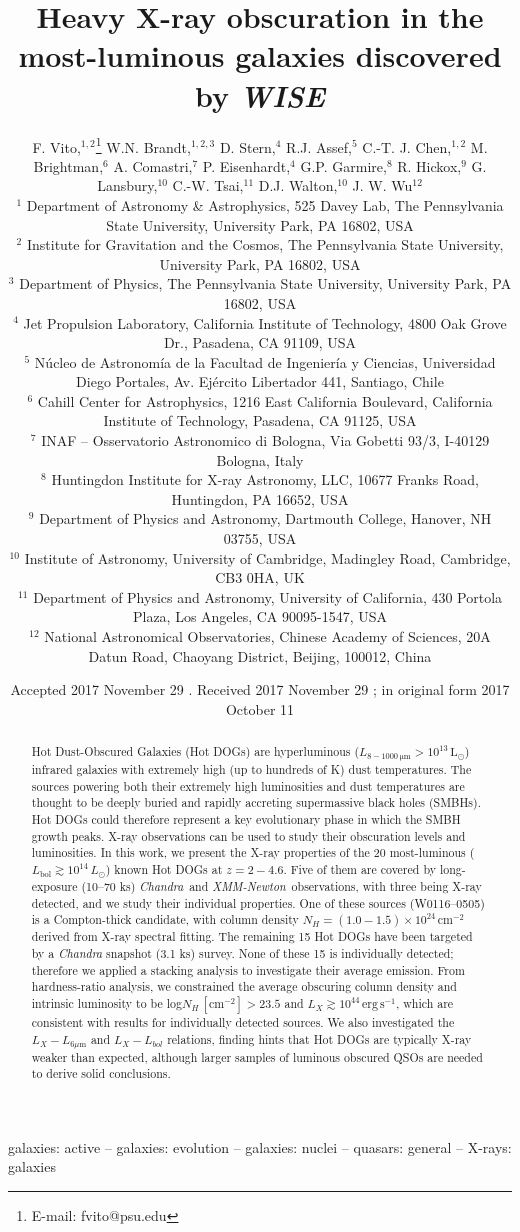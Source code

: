 \documentclass[useAMS,usenatbib]{mnras}
\title[Heavy obscuration in Hot Dust-Obscured Galaxies]{Heavy X-ray obscuration in the most-luminous galaxies discovered by \textit{WISE} }
\author[F. Vito et al.]
{F. Vito,$^{1,2}$\thanks{E-mail: fvito@psu.edu}
W.N. Brandt,$^{1,2,3}$
D. Stern,$^{4}$
R.J. Assef,$^{5}$
C.-T. J. Chen,$^{1,2}$
M. Brightman,$^{6}$
\newauthor
A. Comastri,$^{7}$
P. Eisenhardt,$^{4}$
G.P. Garmire,$^{8}$
R. Hickox,$^{9}$
G. Lansbury,$^{10}$
\newauthor
C.-W. Tsai,$^{11}$
D.J. Walton,$^{10}$
J. W. Wu$^{12}$\\
$^{1}$ Department of Astronomy \& Astrophysics, 525 Davey Lab, The Pennsylvania State University, University Park, PA 16802, USA\\
$^{2}$ Institute for Gravitation and the Cosmos, The Pennsylvania State University, University Park, PA 16802, USA\\
$^{3}$ Department of Physics, The Pennsylvania State University, University Park, PA 16802, USA\\
$^{4}$ Jet Propulsion Laboratory, California Institute of Technology, 4800 Oak Grove Dr., Pasadena, CA 91109, USA\\
$^{5}$ N\'ucleo de Astronom\'ia de la Facultad de Ingenier\'ia y Ciencias, Universidad Diego Portales, Av. Ej\'ercito Libertador 441, Santiago, Chile\\
$^{6}$ Cahill Center for Astrophysics, 1216 East California Boulevard, California Institute of Technology, Pasadena, CA 91125, USA\\
$^{7}$ INAF – Osservatorio Astronomico di Bologna, Via Gobetti 93/3, I-40129 Bologna, Italy\\
$^{8}$ Huntingdon Institute for X-ray Astronomy, LLC, 10677 Franks Road, Huntingdon, PA 16652, USA\\
$^{9}$ Department of Physics and Astronomy, Dartmouth College, Hanover, NH 03755, USA\\
$^{10}$ Institute of Astronomy, University of Cambridge, Madingley Road, Cambridge, CB3 0HA, UK\\
$^{11}$ Department of Physics and Astronomy, University of California, 430 Portola Plaza, Los Angeles, CA 90095-1547, USA\\
$^{12}$ National Astronomical Observatories, Chinese Academy of Sciences, 20A Datun Road, Chaoyang District, Beijing, 100012, China\\
}
\date{Accepted 2017 November 29 . Received 2017 November 29 ; in original form 2017 October 11}
\newcommand*{\lunit}{\ensuremath{\mathrm{erg\,s^{-1}}}}
\newcommand*{\xmm}{\textit{\mbox{XMM-Newton}}}
\newcommand*{\chandra}{\textit{Chandra}}
\newcommand*{\nhunits}{\mathrm{cm^{-2}}}
\begin{document}
\graphicspath{{.}}
\pagerange{\pageref{firstpage}--\pageref{lastpage}} 
\maketitle
\label{firstpage}

\begin{abstract}
Hot Dust-Obscured Galaxies (Hot DOGs) are hyperluminous  (\mbox{$L_{\mathrm{8-1000\,\mu m}}>10^{13}\,\mathrm{L_\odot}$}) infrared galaxies with extremely high (up to hundreds of K) dust temperatures. The sources powering both their extremely high luminosities and dust temperatures are thought to be deeply buried and rapidly accreting supermassive black holes (SMBHs). Hot DOGs could therefore represent a key evolutionary phase in which the SMBH growth peaks. X-ray observations can be used to study their obscuration levels and luminosities. In this work, we present the X-ray properties of the 20 most-luminous ($L_{\mathrm{bol}}\gtrsim10^{14}\, L_\odot$) known Hot DOGs  at $z=2-4.6$. Five of them are covered by long-exposure (10--70 ks) \chandra\, and \xmm\, observations, with three being X-ray detected, and we study their individual properties.
One of these sources (W0116--0505) is a Compton-thick candidate, with column density $N_H=(1.0-1.5)\times10^{24}\,\nhunits$ derived from X-ray spectral fitting. The remaining 15 Hot DOGs have been targeted by a \textit{Chandra} snapshot (3.1 ks) survey. None of these 15 is individually detected; therefore we applied a stacking analysis to investigate their average emission. From hardness-ratio analysis, we constrained the average obscuring column density and intrinsic luminosity to be log$N_H\,\mathrm{[\nhunits]}>23.5$ and $L_X\gtrsim10^{44}\,\lunit$, which are consistent with results for individually detected sources. We also investigated the $L_X-L_{6\mu\mathrm{m}}$ and $L_X-L_{bol}$ relations, finding hints that Hot DOGs are typically X-ray weaker than expected, although larger samples of luminous obscured QSOs are needed to derive solid conclusions.


\end{abstract}
\begin{keywords}
	 galaxies: active -- galaxies: evolution --  galaxies: nuclei -- quasars: general -- X-rays: galaxies 
\end{keywords}
\end{document}
